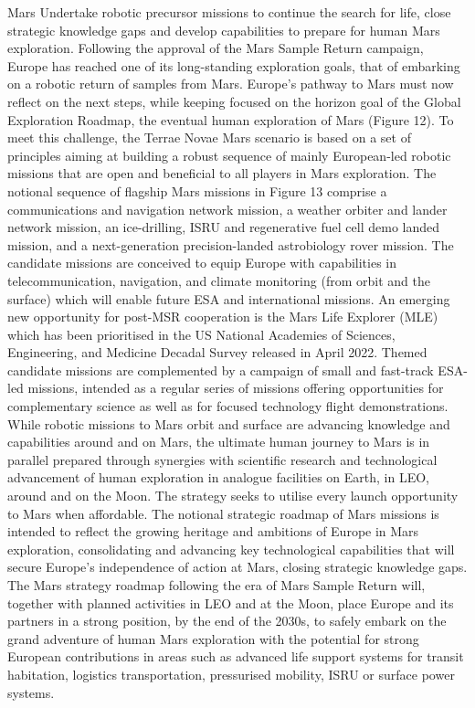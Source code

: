 \documentclass[12pt]{article}
\begin{document}
Mars Undertake robotic precursor missions to continue the search for life, close strategic knowledge gaps and develop capabilities to prepare for human Mars exploration. Following the approval of the Mars Sample Return campaign, Europe has reached one of its long-standing exploration goals, that of embarking on a robotic return of samples from Mars. Europe’s pathway to Mars must now reflect on the next steps, while keeping focused on the horizon goal of the Global Exploration Roadmap, the eventual human exploration of Mars (Figure 12). To meet this challenge, the Terrae Novae Mars scenario is based on a set of principles aiming at building a robust sequence of mainly European-led robotic missions that are open and beneficial to all players in Mars exploration. The notional sequence of flagship Mars missions in Figure 13 comprise a communications and navigation network mission, a weather orbiter and lander network mission, an ice-drilling, ISRU and regenerative fuel cell demo landed mission, and a next-generation precision-landed astrobiology rover mission. The candidate missions are conceived to equip Europe with capabilities in telecommunication, navigation, and climate monitoring (from orbit and the surface) which will enable future ESA and international missions. An emerging new opportunity for post-MSR cooperation is the Mars Life Explorer (MLE) which has been prioritised in the US National Academies of Sciences, Engineering, and Medicine Decadal Survey released in April 2022. Themed candidate missions are complemented by a campaign of small and fast-track ESA-led missions, intended as a regular series of missions offering opportunities for complementary science as well as for focused technology flight demonstrations. While robotic missions to Mars orbit and surface are advancing knowledge and capabilities around and on Mars, the ultimate human journey to Mars is in parallel prepared through synergies with scientific research and technological advancement of human exploration in analogue facilities on Earth, in LEO, around and on the Moon. The strategy seeks to utilise every launch opportunity to Mars when affordable. The notional strategic roadmap of Mars missions is intended to reflect the growing heritage and ambitions of Europe in Mars exploration, consolidating and advancing key technological capabilities that will secure Europe’s independence of action at Mars, closing strategic knowledge gaps. The Mars strategy roadmap following the era of Mars Sample Return will, together with planned activities in LEO and at the Moon, place Europe and its partners in a strong position, by the end of the 2030s, to safely embark on the grand adventure of human Mars exploration with the potential for strong European contributions in areas such as advanced life support systems for transit habitation, logistics transportation, pressurised mobility, ISRU or surface power systems.
\end{document}
